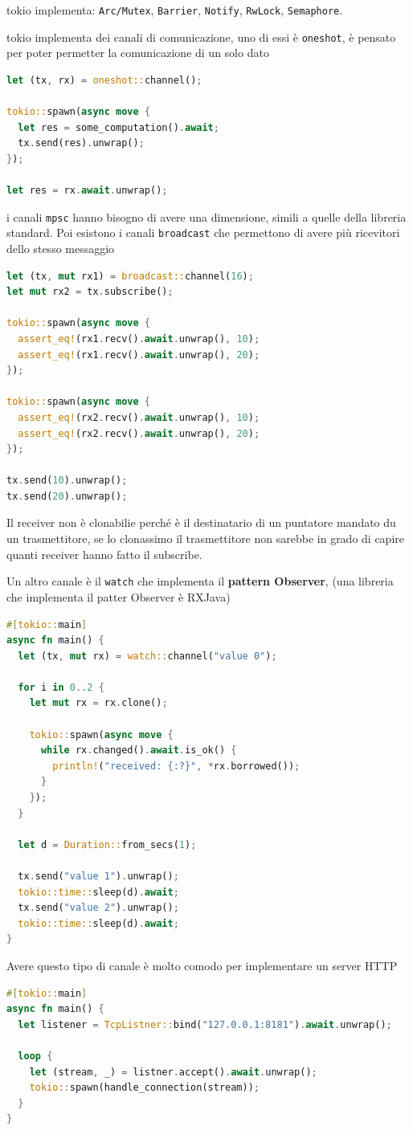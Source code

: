 \documentclass[12pt]{article}
\begin{document}
tokio implementa: \texttt{Arc/Mutex}, \texttt{Barrier}, \texttt{Notify}, \texttt{RwLock}, \texttt{Semaphore}.

tokio implementa dei canali di comunicazione, uno di essi \`e \texttt{oneshot}, \`e pensato per poter permetter la comunicazione di un solo dato
\begin{lstlisting}[language=rust]
let (tx, rx) = oneshot::channel();

tokio::spawn(async move {
  let res = some_computation().await;
  tx.send(res).unwrap();
});

let res = rx.await.unwrap();
\end{lstlisting}
i canali \texttt{mpsc} hanno bisogno di avere una dimensione, simili a quelle della libreria standard. Poi esistono i canali \texttt{broadcast} che permettono di avere pi\`u ricevitori dello stesso messaggio
\begin{lstlisting}[language=rust]
let (tx, mut rx1) = broadcast::channel(16);
let mut rx2 = tx.subscribe();

tokio::spawn(async move {
  assert_eq!(rx1.recv().await.unwrap(), 10);
  assert_eq!(rx1.recv().await.unwrap(), 20);
});

tokio::spawn(async move {
  assert_eq!(rx2.recv().await.unwrap(), 10);
  assert_eq!(rx2.recv().await.unwrap(), 20);
});

tx.send(10).unwrap();
tx.send(20).unwrap();
\end{lstlisting}
Il receiver non \`e clonabilie perch\'e \`e il destinatario di un puntatore mandato du un trasmettitore, se lo clonassimo il trasmettitore non sarebbe in grado di capire quanti receiver hanno fatto il subscribe.

Un altro canale \`e il \texttt{watch} che implementa il \textbf{pattern Observer}, (una libreria che implementa il patter Observer \`e RXJava)
\begin{lstlisting}[language=rust]
#[tokio::main]
async fn main() {
  let (tx, mut rx) = watch::channel("value 0");

  for i in 0..2 {
    let mut rx = rx.clone();

    tokio::spawn(async move {
      while rx.changed().await.is_ok() {
        println!("received: {:?}", *rx.borrowed());
      }
    });
  }

  let d = Duration::from_secs(1);

  tx.send("value 1").unwrap();
  tokio::time::sleep(d).await;
  tx.send("value 2").unwrap();
  tokio::time::sleep(d).await;
}
\end{lstlisting}
Avere questo tipo di canale \`e molto comodo per implementare un server HTTP
\begin{lstlisting}[language=rust]
#[tokio::main]
async fn main() {
  let listener = TcpListner::bind("127.0.0.1:8181").await.unwrap();

  loop {
    let (stream, _) = listner.accept().await.unwrap();
    tokio::spawn(handle_connection(stream));
  }
}
\end{lstlisting}
\end{document}
